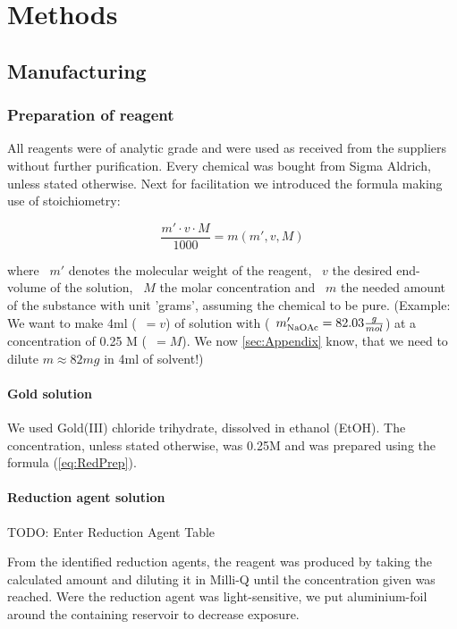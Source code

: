 \section{Methods}
\label{sec:Methods}

\subsection{Manufacturing}

\subsubsection{Preparation of reagent}

All reagents were of analytic grade and were used as received from the suppliers without further  purification. Every chemical was bought from Sigma Aldrich, unless stated otherwise. 
Next for facilitation we introduced the formula making use of stoichiometry:

\begin{equation}
\label{eq:RedPrep}
    \frac{m'\cdot v\cdot M}{1000} = m(m',v,M)
\end{equation}

where ~$m'$ denotes the molecular weight of the reagent, ~$v$ the desired end-volume of the solution, ~$M$ the molar concentration and ~$m$ the needed amount of the substance with unit 'grams', assuming the chemical to be pure. (Example: We want to make 4ml (~$= v$) of solution with  (~$m'_{\ce{NaOAc}}= 82.03 \frac{g}{mol}$) at a concentration of 0.25 M (~$= M$). We now \ref{sec:Appendix} know, that we need to dilute $m \approx 82mg$  in 4ml of solvent!) 

\paragraph{Gold solution}

We used Gold(III) chloride trihydrate, dissolved in ethanol (EtOH). The concentration, unless stated otherwise, was 0.25M and was prepared using the formula (\ref{eq:RedPrep}).


\paragraph{Reduction agent solution}

TODO: Enter Reduction Agent Table

From the identified reduction agents, the reagent was produced by taking the calculated amount and diluting it in Milli-Q  until the concentration given was reached. Were the reduction agent was light-sensitive, we put aluminium-foil around the containing reservoir to decrease exposure.

